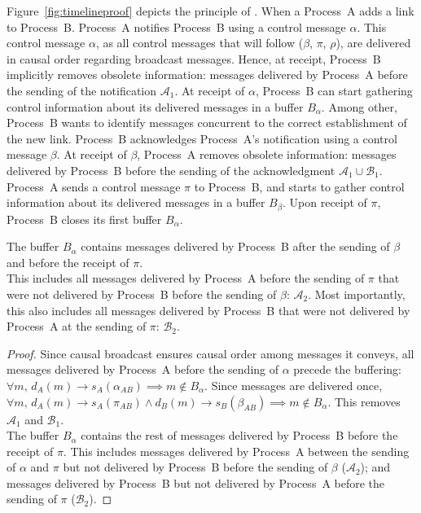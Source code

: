 Figure~\ref{fig:timelineproof} depicts the principle of \RPCBROADCAST. When a
Process~A adds a link to Process~B. %
Process~A notifies Process~B using a control message $\alpha$. This control
message $\alpha$, as all control messages that will follow ($\beta$, $\pi$,
$\rho$), are delivered in causal order regarding broadcast messages. Hence, at
receipt, Process~B implicitly removes obsolete information: messages delivered
by Process~A before the sending of the notification $\mathcal{A}_1$. At receipt
of $\alpha$, Process~B can start gathering control information about its
delivered messages in a buffer $B_\alpha$. Among other, Process~B wants to
identify messages concurrent to the correct establishment of the new
link. Process~B acknowledges Process~A's notification using a control message
$\beta$. At receipt of $\beta$, Process~A removes obsolete information: messages
delivered by Process~B before the sending of the acknowledgment
$\mathcal{A}_1 \cup \mathcal{B}_1$. Process~A sends a control message $\pi$ to
Process~B, and starts to gather control information about its delivered messages
in a buffer $B_\beta$. Upon receipt of $\pi$, Process~B closes its first buffer
$B_\alpha$.
  
\begin{lemma}
  The buffer $B_\alpha$ contains messages delivered by Process~B after the
  sending of $\beta$ and before the receipt of $\pi$.\\
  This includes all messages delivered by Process~A before the sending of $\pi$
  that were not delivered by Process~B before the sending of $\beta$:
  $\mathcal{A}_2$. Most importantly, this also includes all messages delivered
  by Process~B that were not delivered by Process~A at the sending of $\pi$:
  $\mathcal{B}_2$.
\end{lemma}

\begin{proof}
  Since causal broadcast ensures causal order among messages it conveys, all
  messages delivered by Process~A before the sending of $\alpha$ precede the
  buffering:
  $\forall m,\, d_A(m) \rightarrow s_A(\alpha_{AB}) \implies m \not \in
  B_\alpha$.
  Since messages are delivered once,
  $\forall m,\, d_A(m) \rightarrow s_A(\pi_{AB}) \wedge d_B(m) \rightarrow
  s_B(\beta_{AB}) \implies m \not \in B_\alpha$.
  This removes $\mathcal{A}_1$ and $\mathcal{B}_1$.\\
  The buffer $B_\alpha$ contains the rest of messages delivered by Process~B
  before the receipt of $\pi$. This includes messages delivered by Process~A
  between the sending of $\alpha$ and $\pi$ but not delivered by Process~B
  before the sending of $\beta$ ($\mathcal{A}_2$); and messages delivered by
  Process~B but not delivered by Process~A before the sending of $\pi$
  ($\mathcal{B}_2$).
\end{proof}

